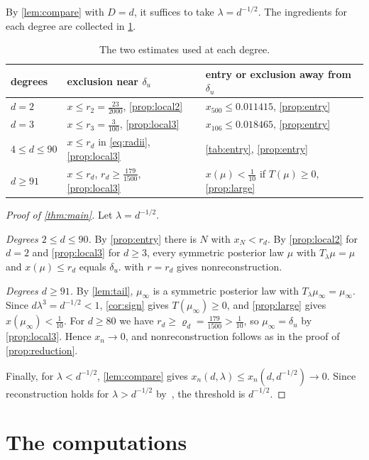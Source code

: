 \documentclass[11pt]{amsart}
\theoremstyle{definition}
\theoremstyle{remark}
\begin{document}
By \cref{lem:compare} with $D=d$, it suffices to take $\lambda=d^{-1/2}$. The ingredients for each degree are
collected in \cref{tab:degrees}.

\begin{table}[ht]
\caption{The two estimates used at each degree.}\label{tab:degrees}
\begin{tabular}{lll}
\hline
degrees & exclusion near $\delta_u$ & entry or exclusion away from $\delta_u$\\
\hline
$d=2$ & $x\le r_2=\tfrac{23}{2000}$, \cref{prop:local2} & $x_{500}\le0.011415$, \cref{prop:entry}\\
$d=3$ & $x\le r_3=\tfrac3{100}$, \cref{prop:local3} & $x_{106}\le0.018465$, \cref{prop:entry}\\
$4\le d\le90$ & $x\le r_d$ in \eqref{eq:radii}, \cref{prop:local3} & \cref{tab:entry}, \cref{prop:entry}\\
$d\ge91$ & $x\le r_d$, $r_d\ge\tfrac{179}{1500}$, \cref{prop:local3} & $x(\mu)<\tfrac1{10}$ if $T(\mu)\ge0$, \cref{prop:large}\\
\hline
\end{tabular}
\end{table}

\begin{proof}[Proof of \cref{thm:main}]
Let $\lambda=d^{-1/2}$.

\emph{Degrees $2\le d\le90$.} By \cref{prop:entry} there is $N$ with $x_N<r_d$. By \cref{prop:local2} for $d=2$
and \cref{prop:local3} for $d\ge3$, every symmetric posterior law $\mu$ with $T_\lambda\mu=\mu$ and
$x(\mu)\le r_d$ equals $\delta_u$.  with $r=r_d$ gives nonreconstruction.

\emph{Degrees $d\ge91$.} By \cref{lem:tail}, $\mu_\infty$ is a symmetric posterior law with
$T_\lambda\mu_\infty=\mu_\infty$. Since $d\lambda^3=d^{-1/2}<1$, \cref{cor:sign} gives $T(\mu_\infty)\ge0$, and
\cref{prop:large} gives $x(\mu_\infty)<\tfrac1{10}$. For $d\ge80$ we have $r_d\ge\varrho_d=\tfrac{179}{1500}>\tfrac1{10}$,
so $\mu_\infty=\delta_u$ by \cref{prop:local3}. Hence $x_n\to0$, and nonreconstruction follows as in the proof of
\cref{prop:reduction}.

Finally, for $\lambda<d^{-1/2}$, \cref{lem:compare} gives $x_n(d,\lambda)\le x_n(d,d^{-1/2})\to0$. Since
reconstruction holds for $\lambda>d^{-1/2}$ by~\cite{KS66}, the threshold is $d^{-1/2}$.
\end{proof}

\section{The computations}\label{sec:computations}
\end{document}
